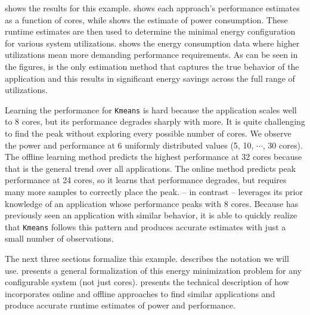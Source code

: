  shows the results for this example.
 shows each approach's performance estimates as
a function of cores, while  shows the estimate
of power consumption.  These runtime estimates are then used to
determine the minimal energy configuration for various system
utilizations.   shows the energy consumption
data where higher utilizations mean more demanding performance
requirements.  As can be seen in the figures, \SYSTEMLEO{} is the only
estimation method that captures the true behavior of the application
and this results in significant energy savings across the full range
of utilizations.

Learning the performance for \texttt{Kmeans} is hard because the
application scales well to 8 cores, but its performance degrades
sharply with more.  It is quite challenging to find the peak without
exploring every possible number of cores. We observe the power and
performance at 6 uniformly distributed values (5, 10, $\cdots$, 30
cores).  The offline learning method predicts the highest performance
at 32 cores because that is the general trend over all applications.
The online method predicts peak performance at 24 cores, so it learns
that performance degrades, but requires many more samples to correctly
place the peak.  \SYSTEMLEO{} -- in contrast -- leverages its prior
knowledge of an application whose performance peaks with 8 cores.
Because \SYSTEMLEO{} has previously seen an application with similar
behavior, it is able to quickly realize that \texttt{Kmeans} follows
this pattern and \SYSTEMLEO{} produces accurate estimates with just a
small number of observations.

The next three sections formalize this example.  
describes the notation we will use. 
presents a general formalization of this energy minimization problem
for any configurable system (not just cores).  
presents the technical description of how \SYSTEMLEO{} incorporates
online and offline approaches to find similar applications and produce
accurate runtime estimates of power and performance.
